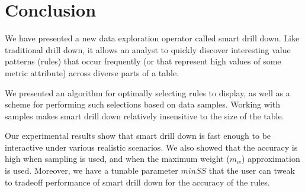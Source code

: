

\section{Conclusion}\label{sec:conclusion}
We have presented a new data exploration operator called smart drill down.
Like traditional drill down, it allows an analyst
to quickly discover interesting value patterns (rules) that occur frequently
(or that represent high values of some metric attribute)
across diverse parts of a table.

We presented an algorithm for optimally selecting rules
to display, as well as a scheme for performing such selections
based on data samples. Working with samples makes smart drill down
relatively insensitive to the size of the table.

Our experimental results show that smart drill down
is fast enough to be interactive under various
realistic scenarios. We also showed that the accuracy is high
when sampling is used, and when the maximum weight ($m_w$)
approximation is used. Moreover, we have a tunable parameter $minSS$ that the user can tweak to tradeoff performance of smart drill down for the accuracy of the rules.